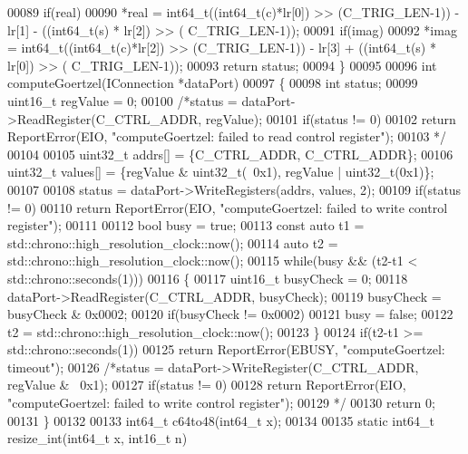 \begin{DoxyCode}
00089     \textcolor{keywordflow}{if}(real)
00090         *real = int64\_t((int64\_t(c)*lr[0]) >> (C_TRIG_LEN-1)) - lr[1] - ((int64\_t(s) * lr[2]) >> (
      C_TRIG_LEN-1));
00091     \textcolor{keywordflow}{if}(imag)
00092         *imag = int64\_t((int64\_t(c)*lr[2]) >> (C_TRIG_LEN-1)) - lr[3] + ((int64\_t(s) * lr[0]) >> (
      C_TRIG_LEN-1));
00093     \textcolor{keywordflow}{return} status;
00094 \}
00095 
00096 \textcolor{keywordtype}{int} computeGoertzel(IConnection *dataPort)
00097 \{
00098     \textcolor{keywordtype}{int} status;
00099     uint16\_t regValue = 0;
00100     \textcolor{comment}{/*status = dataPort->ReadRegister(C\_CTRL\_ADDR, regValue);}
00101 \textcolor{comment}{    if(status != 0)}
00102 \textcolor{comment}{        return ReportError(EIO, "computeGoertzel: failed to read control register");}
00103 \textcolor{comment}{    */}
00104 
00105     uint32\_t addrs[] = \{C_CTRL_ADDR, C_CTRL_ADDR\};
00106     uint32\_t values[] = \{regValue & uint32\_t(~0x1), regValue | uint32\_t(0x1)\};
00107 
00108     status = dataPort->WriteRegisters(addrs, values, 2);
00109     \textcolor{keywordflow}{if}(status != 0)
00110         \textcolor{keywordflow}{return} ReportError(EIO, \textcolor{stringliteral}{"computeGoertzel: failed to write control register"});
00111 
00112     \textcolor{keywordtype}{bool} busy = \textcolor{keyword}{true};
00113     \textcolor{keyword}{const} \textcolor{keyword}{auto} t1 = std::chrono::high\_resolution\_clock::now();
00114     \textcolor{keyword}{auto} t2 = std::chrono::high\_resolution\_clock::now();
00115     \textcolor{keywordflow}{while}(busy && (t2-t1 < std::chrono::seconds(1)))
00116     \{
00117         uint16\_t busyCheck = 0;
00118         dataPort->ReadRegister(C\_CTRL\_ADDR, busyCheck);
00119         busyCheck = busyCheck & 0x0002;
00120         \textcolor{keywordflow}{if}(busyCheck != 0x0002)
00121             busy = \textcolor{keyword}{false};
00122         t2 = std::chrono::high\_resolution\_clock::now();
00123     \}
00124     \textcolor{keywordflow}{if}(t2-t1 >= std::chrono::seconds(1))
00125         \textcolor{keywordflow}{return} ReportError(EBUSY, \textcolor{stringliteral}{"computeGoertzel: timeout"});
00126     \textcolor{comment}{/*status = dataPort->WriteRegister(C\_CTRL\_ADDR, regValue & ~0x1);}
00127 \textcolor{comment}{    if(status != 0)}
00128 \textcolor{comment}{        return ReportError(EIO, "computeGoertzel: failed to write control register");}
00129 \textcolor{comment}{    */}
00130     \textcolor{keywordflow}{return} 0;
00131 \}
00132 
00133 int64\_t c64to48(int64\_t x);
00134 
00135 \textcolor{keyword}{static} int64\_t resize_int(int64\_t x, int16\_t n)

\end{DoxyCode}
